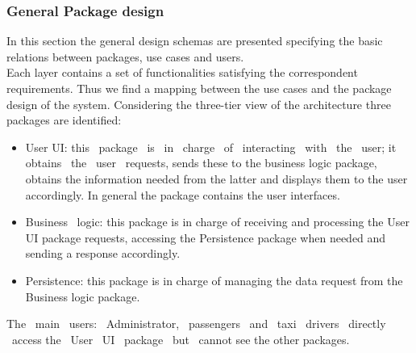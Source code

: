 \documentclass[a4paper,11pt]{report} %
\begin{document}
	\subsubsection{General Package design}
	In this section the general design schemas are presented specifying the basic relations between packages, use cases and users. \\
	Each layer contains a set of functionalities satisfying the correspondent requirements. Thus we find a mapping between the use cases and the package design of the system.  
	Considering the three-tier view of the architecture three packages are identified: 
	\begin{itemize}
		\item User UI: this  package  is  in  charge  of  interacting  with  the  user; it  obtains  the  user  requests, sends these to the business logic package, obtains the information needed from the latter and displays them to the user accordingly. In general the package contains the user interfaces.
		\item Business  logic: this package is in charge of receiving and processing the User UI package requests, accessing the Persistence package when needed and sending a response accordingly. 
		\item Persistence: this package is in charge of managing the data request from the Business logic package.
	\end{itemize}
	The  main  users:  Administrator,  passengers  and  taxi  drivers  directly  access the  User  UI  package  but  cannot see the other packages. \\
	\begin{minipage}{\linewidth}
	\end{minipage}	
	
\end{document}

